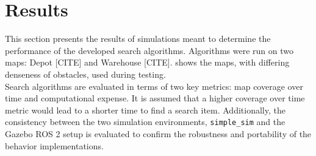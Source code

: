 
\section{Results}
\label{sec:results}
This section presents the results of simulations meant to determine the performance of the developed search algorithms. Algorithms were run on two maps: Depot {\color{red} [CITE]} and Warehouse {\color{red} [CITE]}.  shows the maps, with differing denseness of obstacles, used during testing. \\

Search algorithms are evaluated in terms of two key metrics: map coverage over time and computational expense. It is assumed that a higher coverage over time metric would lead to a shorter time to find a search item. Additionally, the consistency between the two simulation environments, \texttt{simple\_sim} and the Gazebo ROS 2 setup is evaluated to confirm the robustness and portability of the behavior implementations.

